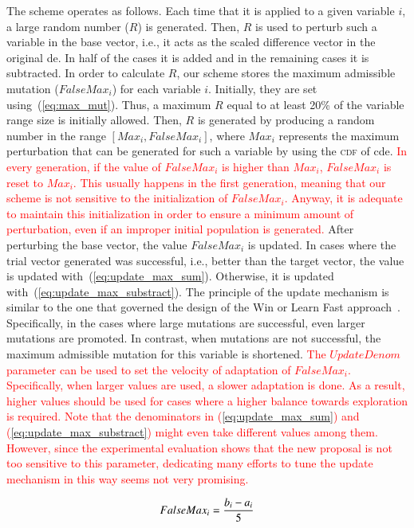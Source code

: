 \documentclass[review,3p]{elsarticle}
\newcommand{\CDE}{c{\sc de}}
\newcommand{\DE}{{\sc de}}
\begin{document}
The scheme operates as follows.
%
Each time that it is applied to a given variable $i$, a large random number ($R$) is generated.
%
Then, $R$ is used to perturb such a variable in the base vector, i.e., it acts as the scaled difference vector in the original \DE{}.
%
In half of the cases it is added and in the remaining cases it is subtracted.
%
In order to calculate $R$, our scheme stores the maximum admissible mutation ($FalseMax_i$) for each variable $i$.
%
Initially, they are set using~(\ref{eq:max_mut}).
%
Thus, a maximum $R$ equal to at least 20\% of the variable range size is initially allowed.
%
Then, $R$ is generated by producing a random number in the range $[Max_i, FalseMax_i]$, 
where $Max_i$ represents the maximum perturbation that can be generated for such a variable by using the \textsc{cdf} of \CDE{}.
%
\textcolor{red}{
In every generation, if the value of $FalseMax_i$ is higher than $Max_i$, $FalseMax_i$ is reset to $Max_i$.
%
This usually happens in the first generation, meaning that our scheme is not sensitive to the initialization of $FalseMax_i$.
%
Anyway, it is adequate to maintain this initialization in order to ensure a minimum amount of perturbation, even if
an improper initial population is generated.
}
%
After perturbing the base vector, the value $FalseMax_i$ is updated.
%
In cases where the trial vector generated was successful, i.e., better than the target vector,
the value is updated with~(\ref{eq:update_max_sum}).
%
Otherwise, it is updated with~(\ref{eq:update_max_substract}).
%
The principle of the update mechanism is 
similar to the one that governed the design of the Win or Learn Fast approach~\cite{Bowling:01}.
%
Specifically, in the cases where large mutations are successful, even larger mutations
are promoted.
%
In contrast, when mutations are not successful, the maximum admissible mutation for this variable is shortened.
%
\textcolor{red}{
The $UpdateDenom$ parameter can be used to set the velocity of adaptation of $FalseMax_i$.
%
Specifically, when larger values are used, a slower adaptation is done.
%
As a result, higher values should be used for cases where a higher balance towards exploration is required.
%
Note that the denominators in (\ref{eq:update_max_sum}) and (\ref{eq:update_max_substract}) might even take different values among them.
%
However, since the experimental evaluation shows that the new proposal is not too sensitive to this parameter, dedicating many
efforts to tune the update mechanism in this way seems not very promising.
}

\begin{equation}
	\label{eq:max_mut}
		FalseMax_i = {{b_i - a_i}\over{5}}
\end{equation}
\end{document}
